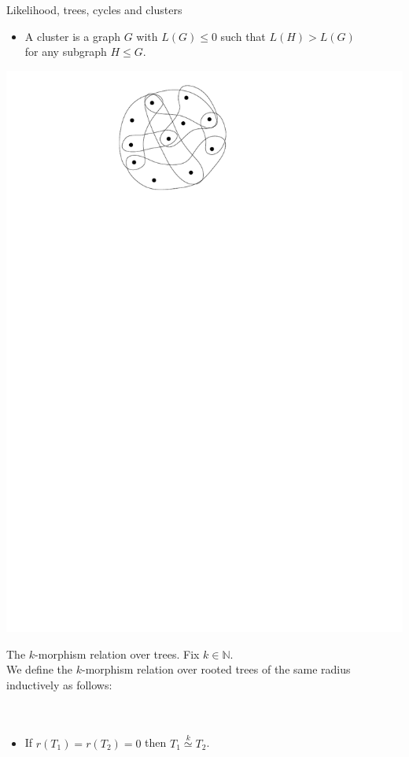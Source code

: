 \documentclass[11pt]{beamer}
\newcommand{\N}{\mathbb{N}}
\newcommand{\morph}[1]{\stackrel{#1}{\simeq}}
\begin{document}
	\begin{frame}{Likelihood, trees, cycles and clusters}
		\begin{itemize}
			\item A cluster is a graph $G$ with $L(G)\leq 0$ such 
			that $L(H)>L(G)$\\ for any subgraph $H\leq G$.
		\end{itemize}
	\begin{center}
		\includegraphics[width=0.4\linewidth]{Cluster.pdf}
	\end{center}
	\end{frame}
	
%		

	\begin{frame}{The $k$-morphism relation over trees.}
		Fix $k\in \N$.\\
		We define the $k$-morphism relation over rooted trees of the same radius
		inductively as follows:
		\\~\\~\\
		\begin{itemize}
			\item If $r(T_1)=r(T_2)=0$ then $T_1\morph{k} T_2$.
		\end{itemize}
	\end{frame}
\end{document}
